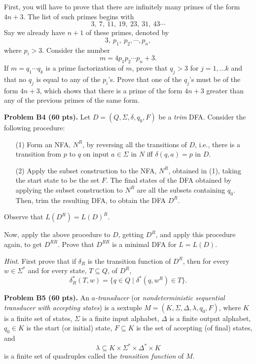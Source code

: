 \documentclass[12pt]{article}
\begin{document}
\medskip
\hint
First, you will have to prove that there are infinitely many primes
of the form $4n + 3$. The list of such primes begins with
\[
3, \> 7, \> 11, \> 19, \> 23,\> 31, \> 43 \cdots
\]
Say we already have  $n + 1$ of these primes, denoted by
\[
3,\> p_1, \> p_2, \cdots, p_n,
\]
where $p_i > 3$. Consider the number
\[
m = 4p_1p_2 \cdots p_n + 3.
\]
If $m = q_1 \cdots q_k$ is a prime factorization of $m$, prove that
$q_j > 3$ for $j = 1, \ldots k$ and that no $q_j$ is equal to any of the 
$p_i$'s. Prove that one of the $q_j$'s must be of the form
$4n + 3$, which shows that there is a prime of the form $4n + 3$
greater than any of the previous primes of the same form.

\vspace{0.25cm}\noindent
{\bf Problem B4 (60 pts).} 
Let $D = (Q, \Sigma, \delta, q_0, F)$ be a {\it trim\/} DFA.
Consider the following procedure:
\begin{enumerate}
\item[(1)]
Form an NFA, $N^R$,  by reversing all the transitions
of $D$, i.e., there is a transition from $p$ to $q$ on
input $a\in \Sigma$ in $N$ iff $\delta(q, a) = p$ in $D$.
\item[(2)]
Apply the subset construction to the NFA, $N^R$, obtained in (1),
taking the start state to be the set $F$. The final states of the
DFA obtained by applying the subset construction to $N^R$ are all the
subsets containing $q_0$. 
Then, trim the resulting DFA,
to obtain the DFA $D^R$. 
\end{enumerate}

Observe that $L(D^R) = L(D)^R$.

\medskip
Now, apply the above procedure to $D$, getting $D^R$, and
apply this procedure again, to get $D^{RR}$.
Prove that $D^{RR}$ is a minimal DFA for $L = L(D)$.

\medskip\noindent
{\it Hint\/}.
First prove that if $\delta_R$ is the transition function
of $D^R$, then for every $w\in \Sigma^*$ and for every
state, $T\subseteq Q$, of $D^R$,
\[
\delta_R^*(T, w) =  \{q\in Q \mid \delta^*(q, w^R) \in T\}.
\]

\vspace{0.25cm}\noindent
{\bf Problem B5 (60 pts).} 
An {\it $a$-transducer\/} (or {\it nondeterministic
sequential transducer with accepting states\/})
is a sextuple 
$M = (K, \Sigma, \Delta, \lambda, q_0, F)$,
where $K$ is a finite set of states, $\Sigma$ is a
finite input alphabet, $\Delta$ is a finite output alphabet,
$q_0\in K$ is the start (or initial) state, $F\subseteq K$ is the
set of accepting (of final) states, and
$$\lambda \subseteq K\times \Sigma^*\times \Delta^*\times K$$
is a finite set of quadruples called the {\it transition function\/} 
of $M$.
\end{document}
